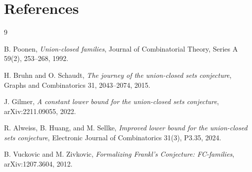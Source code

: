 \documentclass[11pt]{article}
\begin{document}
\section{References}

\begin{thebibliography}{9}

B. Poonen,
\emph{Union-closed families},
Journal of Combinatorial Theory, Series A 59(2), 253--268, 1992.

H. Bruhn and O. Schaudt,
\emph{The journey of the union-closed sets conjecture},
Graphs and Combinatorics 31, 2043--2074, 2015.

J. Gilmer,
\emph{A constant lower bound for the union-closed sets conjecture},
arXiv:2211.09055, 2022.

R. Alweiss, B. Huang, and M. Sellke,
\emph{Improved lower bound for the union-closed sets conjecture},
Electronic Journal of Combinatorics 31(3), P3.35, 2024.

B. Vuckovic and M. Zivkovic,
\emph{Formalizing Frankl's Conjecture: FC-families},
arXiv:1207.3604, 2012.

\end{thebibliography}
\end{document}
